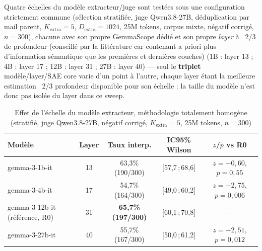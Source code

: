 \documentclass[11pt]{article}
\begin{document}
Quatre échelles du modèle extracteur/juge sont testées sous une configuration
strictement commune (sélection stratifiée, juge Qwen3.8-27B, déduplication
par mail parent, $K_\text{extra}=5$, $D_\text{extra}=1024$, 25M tokens,
corpus mixte, négatif corrigé, $n=300$), chacune avec son propre GemmaScope
dédié et son propre \emph{layer} à \og{}~2/3 de profondeur\fg{} (conseillé par la littérature car contenant a priori plus d'information sémantique que les premières et dernières couches)
\cite{formal2026splare} (1B : layer 13 ; 4B : layer 17 ; 12B : layer 31 ;
27B : layer 40) --- seul le \textbf{triplet} modèle/layer/SAE core varie
d'un point à l'autre, chaque layer étant la meilleure estimation
\og{}~2/3 profondeur\fg{} disponible pour son échelle : la taille du modèle
n'est donc pas isolée du layer dans ce sweep.

\begin{table}[h!]
\centering
\caption{Effet de l'échelle du modèle extracteur, méthodologie totalement homogène (stratifié, juge Qwen3.8-27B, négatif corrigé, $K_\text{extra}=5$, 25M tokens, $n=300$)}
\label{tab:model-scale}
\vspace{0.4em}\small
\begin{tabular}{@{}lcccc@{}}
\toprule
\textbf{Modèle} & \textbf{Layer} & \textbf{Taux interp.} & \textbf{IC95\% Wilson} & \textbf{$z$/$p$ vs R0} \\ \midrule
gemma-3-1b-it & 13 & 63,3\% (190/300) & [57,7\,;\,68,6] & $z=-0{,}60$, $p=0{,}55$ \\
gemma-3-4b-it & 17 & 54,7\% (164/300) & [49,0\,;\,60,2] & $z=-2{,}75$, $p=0{,}006$ \\
gemma-3-12b-it (référence, R0) & 31 & \textbf{65,7\% (197/300)} & [60,1\,;\,70,8] & --- \\
gemma-3-27b-it & 40 & 55,7\% (167/300) & [50,0\,;\,61,2] & $z=-2{,}51$, $p=0{,}012$ \\
\bottomrule
\end{tabular}
\end{table}
\end{document}
